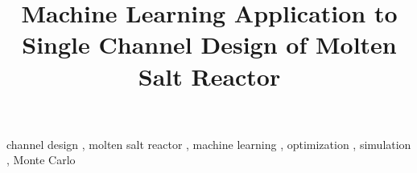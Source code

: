 \documentclass[review]{elsarticle}
\begin{document}
	\begin{frontmatter}
		\title{Machine Learning Application to
			Single Channel Design of Molten Salt Reactor}

		

		

		\begin{keyword}
			channel design \sep
			molten salt reactor \sep
			machine learning \sep
			optimization \sep
			simulation \sep
			Monte Carlo
		\end{keyword}

		
	\end{frontmatter}
	\glsresetall

	\linenumbers

	
	
	
	
	

	
\end{document}
